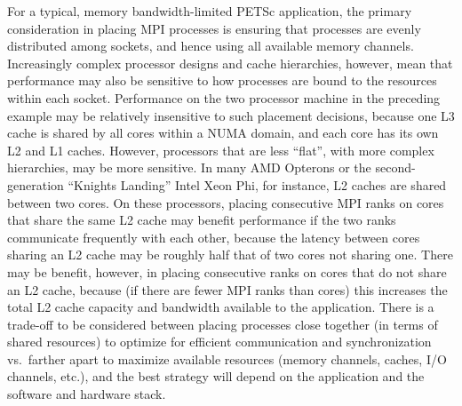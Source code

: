 {{For a typical, memory bandwidth-limited PETSc application, the primary consideration in placing MPI processes is
ensuring that processes are evenly distributed among sockets, and hence using all available memory channels.
Increasingly complex processor designs and cache hierarchies, however, mean that performance may also be sensitive to how
processes are bound to the resources within each socket.
Performance on the two processor machine in the preceding example may be relatively insensitive to such placement decisions,
because one L3 cache is shared by all cores within a NUMA domain, and each core has its own L2 and L1 caches.
However, processors that are less ``flat'', with more complex hierarchies, may be more sensitive.
In many AMD Opterons or the second-generation ``Knights Landing'' Intel Xeon Phi, for instance, L2 caches are shared
between two cores.
On these processors, placing consecutive MPI ranks on cores that share the same L2 cache may benefit performance if
the two ranks communicate frequently with each other, because the latency between cores sharing an L2
cache may be roughly half that of two cores not sharing one.
There may be benefit, however, in placing consecutive ranks on cores that do not share an L2 cache, because (if there
are fewer MPI ranks than cores) this increases the total L2 cache capacity and bandwidth available to the application.
There is a trade-off to be considered between placing processes close together (in terms of shared resources) to
optimize for efficient communication and synchronization vs.\ farther apart to maximize available resources (memory
channels, caches, I/O channels, etc.), and the best strategy will depend on the application and the software and
hardware stack.

}}
